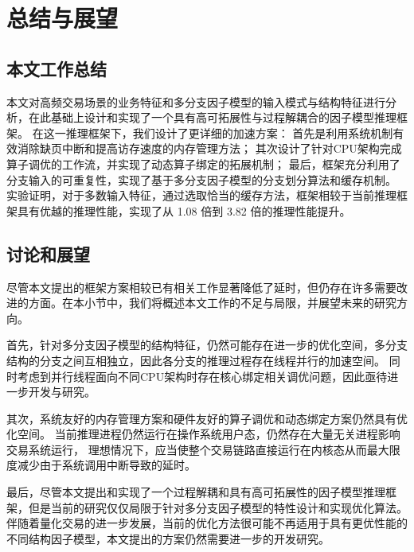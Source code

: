 \chapter{总结与展望}
\label{cha:experiment}

\section{本文工作总结}
本文对高频交易场景的业务特征和多分支因子模型的输入模式与结构特征进行分析，在此基础上设计和实现了一个具有高可拓展性与过程解耦合的因子模型推理框架。
在这一推理框架下，我们设计了更详细的加速方案：
首先是利用系统机制有效消除缺页中断和提高访存速度的内存管理方法；
其次设计了针对CPU架构完成算子调优的工作流，并实现了动态算子绑定的拓展机制；
最后，框架充分利用了分支输入的可重复性，实现了基于多分支因子模型的分支划分算法和缓存机制。
实验证明，对于多数输入特征，通过选取恰当的缓存方法，框架相较于当前推理框架具有优越的推理性能，实现了从 1.08 倍到 3.82 倍的推理性能提升。


\section{讨论和展望}
尽管本文提出的框架方案相较已有相关工作显著降低了延时，但仍存在许多需要改进的方面。在本小节中，我们将概述本文工作的不足与局限，并展望未来的研究方向。

首先，针对多分支因子模型的结构特征，仍然可能存在进一步的优化空间，多分支结构的分支之间互相独立，因此各分支的推理过程存在线程并行的加速空间。
同时考虑到并行线程面向不同CPU架构时存在核心绑定相关调优问题，因此亟待进一步开发与研究。

其次，系统友好的内存管理方案和硬件友好的算子调优和动态绑定方案仍然具有优化空间。
当前推理进程仍然运行在操作系统用户态，仍然存在大量无关进程影响交易系统运行，
理想情况下，应当使整个交易链路直接运行在内核态从而最大限度减少由于系统调用中断导致的延时。

最后，尽管本文提出和实现了一个过程解耦和具有高可拓展性的因子模型推理框架，但是当前的研究仅仅局限于针对多分支因子模型的特性设计和实现优化算法。
伴随着量化交易的进一步发展，当前的优化方法很可能不再适用于具有更优性能的不同结构因子模型，本文提出的方案仍然需要进一步的开发研究。
